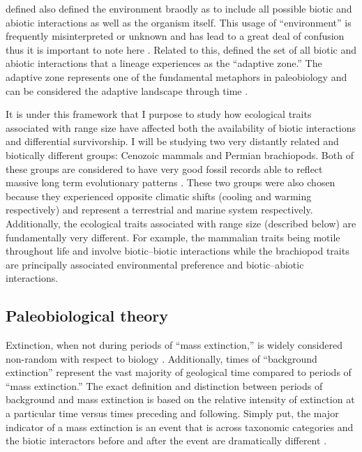 \documentclass[12pt,letterpaper]{article}
\begin{document}
\citet{Simpson1944} defined also defined the environment braodly as to include all possible biotic and abiotic interactions as well as the organism itself. This usage of ``environment'' is frequently misinterpreted or unknown and has lead to a great deal of confusion thus it is important to note here \citep{VanValen1973,Barnosky2001a,Liow2011a}. Related to this, \citet{Simpson1944} defined the set of all biotic and abiotic interactions that a lineage experiences as the ``adaptive zone.'' The adaptive zone represents one of the fundamental metaphors in paleobiology and can be considered the adaptive landscape through time \citep{Simpson1944,Simpson1953}. 

It is under this framework that I purpose to study how ecological traits associated with range size have affected both the availability of biotic interactions and differential survivorship. I will be studying two very distantly related and biotically different groups: Cenozoic mammals and Permian brachiopods. Both of these groups are considered to have very good fossil records able to reflect massive long term evolutionary patterns \citep{Mark1977}. These two groups were also chosen because they experienced opposite climatic shifts (cooling and warming respectively) and represent a terrestrial and marine system respectively. Additionally, the ecological traits associated with range size (described below) are fundamentally very different. For example, the mammalian traits being motile throughout life and involve biotic--biotic interactions while the brachiopod traits are principally associated environmental preference and biotic--abiotic interactions.



\subsection{Paleobiological theory}
Extinction, when not during periods of ``mass extinction,'' is widely considered non-random with respect to biology \citep{Jablonski1986}. Additionally, times of ``background extinction'' represent the vast majority of geological time compared to periods of ``mass extinction.'' The exact definition and distinction between periods of background and mass extinction is based on the relative intensity of extinction at a particular time versus times preceding and following. Simply put, the major indicator of a mass extinction is an event that is across taxonomic categories and the biotic interactors before and after the event are dramatically different \citep{Jablonski1986,Jablonski2005,Kitchell1986,Kitchell1991}.
\end{document}
